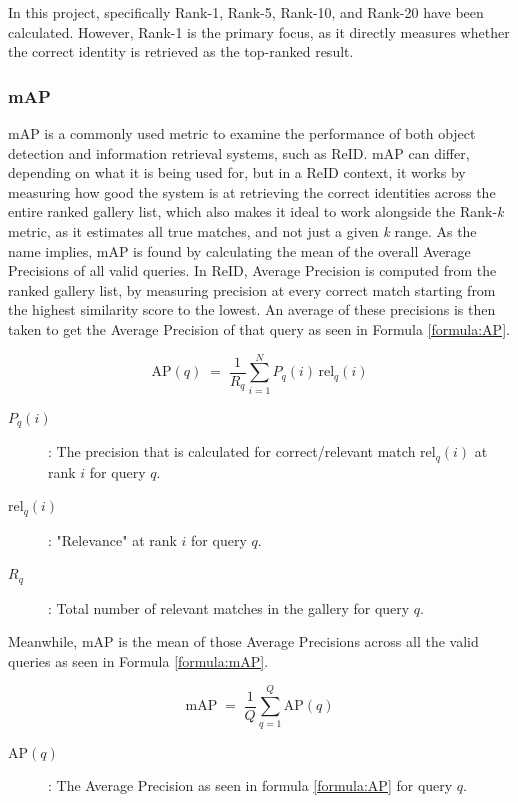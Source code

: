 \noindent In this project, specifically Rank-1, Rank-5, Rank-10, and Rank-20 have been calculated. However, Rank-1 is the primary focus, as it directly measures whether the correct identity is retrieved as the top-ranked result.


\subsubsection*{\acs{mAP}}
\acf{mAP} is a commonly used metric to examine the performance of both object detection and information retrieval systems, such as \acs{ReID}. \acs{mAP} can differ, depending on what it is being used for, but in a \acs{ReID} context, it works by measuring how good the system is at retrieving the correct identities across the entire ranked gallery list, which also makes it ideal to work alongside the Rank-\textit{k} metric, as it estimates all true matches, and not just a given \textit{k} range. As the name implies, \acs{mAP} is found by calculating the mean of the overall Average Precisions of all valid queries. In \acs{ReID}, Average Precision is computed from the ranked gallery list, by measuring precision at every correct match starting from the highest similarity score to the lowest. An average of these precisions is then taken to get the Average Precision of that query as seen in Formula \ref{formula:AP}. 

\begin{equation}
\mathrm{AP}(q)
\;=\;
\frac{1}{R_q}\sum_{i=1}^{N} P_q(i)\,\mathrm{rel}_q(i)
\label{formula:AP}
\end{equation}

\begin{description}
    \item[$P_q(i)$]: The precision that is calculated for correct/relevant match $\mathrm{rel}_q(i)$ at rank $i$ for query $q$.
    \item[$\mathrm{rel}_q(i)$]: "Relevance" at rank $i$ for query $q$.
    \item[$R_q$]: Total number of relevant matches in the gallery for query $q$.

\end{description}

\noindent Meanwhile, \acs{mAP} is the mean of those Average Precisions across all the valid queries as seen in Formula \ref{formula:mAP}. 

\begin{equation}
\mathrm{mAP}
\;=\;
\frac{1}{Q}\sum_{q=1}^{Q}\mathrm{AP}(q)
\label{formula:mAP}
\end{equation}
\begin{description}
    \item[$\mathrm{AP}(q)$]: The Average Precision as seen in formula \ref{formula:AP} for query $q$.
\end{description}

